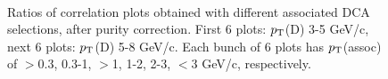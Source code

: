 \begin{figure}[h]
 \\
 \caption{Ratios of correlation plots obtained with different associated DCA selections, after purity correction. First 6 plots: $p_{\rm T}$(D) 3-5 GeV/c, next 6 plots: $p_{\rm T}$(D) 5-8 GeV/c. Each bunch of 6 plots has $p_{\rm T}$(assoc) of $>$0.3, 0.3-1, $>$1, 1-2, 2-3, $<$3 GeV/c, respectively.}
\label{fig:DCAvarData}
\end{figure}

